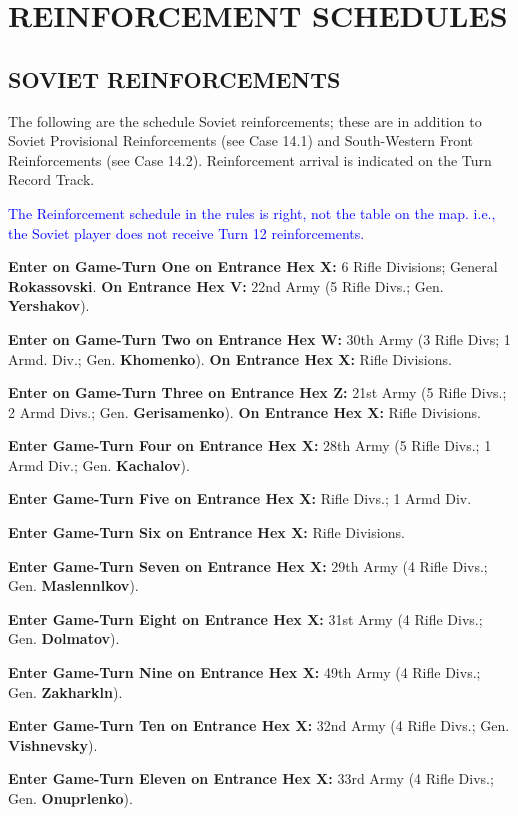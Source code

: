 \section{REINFORCEMENT SCHEDULES}

\subsection{SOVIET REINFORCEMENTS}

The following are the schedule Soviet reinforcements; these are in addition to Soviet Provisional Reinforcements (see Case 14.1) and South-Western Front Reinforcements (see Case 14.2). Reinforcement arrival is indicated on the Turn Record Track.

\textcolor{blue}{The Reinforcement schedule in the rules is right, not the table on the map. i.e., the Soviet player does not receive Turn 12 reinforcements.}

\begin{flushleft}
  \textbf{Enter on Game-Turn One on Entrance Hex X:}
  6 Rifle Divisions; General \textbf{Rokassovski}.
  \break
  \textbf{On Entrance Hex V:}
  \break
  22nd Army (5 Rifle Divs.; Gen. \textbf{Yershakov}).

  \textbf{Enter on Game-Turn Two on Entrance Hex W:}
  30th Army (3 Rifle Divs; 1 Armd. Div.; Gen. \textbf{Khomenko}).
  \break
  \textbf{On Entrance Hex X:}
   Rifle Divisions.

  \textbf{Enter on Game-Turn Three on Entrance Hex Z:}
  21st Army (5 Rifle Divs.; 2 Armd Divs.; Gen. \textbf{Gerisamenko}).
  \break
  \textbf{On Entrance Hex X:}
   Rifle Divisions.

  \textbf{Enter Game-Turn Four on Entrance Hex X:}
  28th Army (5 Rifle Divs.; 1 Armd Div.; Gen. \textbf{Kachalov}).

  \textbf{Enter Game-Turn Five on Entrance Hex X:}
   Rifle Divs.; 1 Armd Div.

  \textbf{Enter Game-Turn Six on Entrance Hex X:}
   Rifle Divisions.

  \textbf{Enter Game-Turn Seven on Entrance Hex X:}
  \break
  29th Army (4 Rifle Divs.; Gen. \textbf{Maslennlkov}).

  \textbf{Enter Game-Turn Eight on Entrance Hex X:}
  \break
  31st Army (4 Rifle Divs.; Gen. \textbf{Dolmatov}).

  \textbf{Enter Game-Turn Nine on Entrance Hex X:}
  \break
  49th Army (4 Rifle Divs.; Gen. \textbf{Zakharkln}).

  \textbf{Enter Game-Turn Ten on Entrance Hex X:}
  \break
  32nd Army (4 Rifle Divs.; Gen. \textbf{Vishnevsky}).

  \textbf{Enter Game-Turn Eleven on Entrance Hex X:}
  \break
  33rd Army (4 Rifle Divs.; Gen. \textbf{Onuprlenko}).
\end{flushleft}

